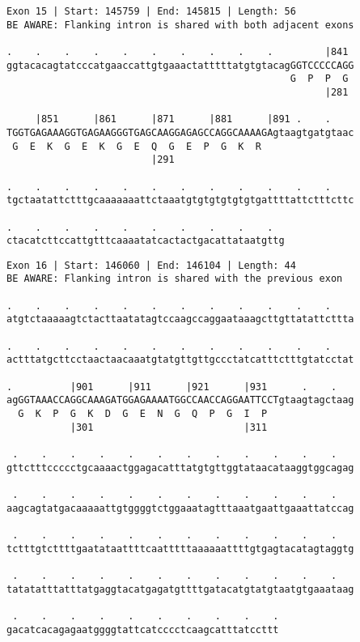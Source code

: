 \documentclass{article}
\begin{document}
\newpage
\begin{Verbatim}[fontfamily=courier]
Exon 15 | Start: 145759 | End: 145815 | Length: 56
BE AWARE: Flanking intron is shared with both adjacent exons

.    .    .    .    .    .    .    .    .    .         |841 
ggtacacagtatcccatgaaccattgtgaaactatttttatgtgtacagGGTCCCCCAGG
                                                 G  P  P  G 
                                                       |281 

     |851      |861      |871      |881      |891 .    .    
TGGTGAGAAAGGTGAGAAGGGTGAGCAAGGAGAGCCAGGCAAAAGAgtaagtgatgtaac
 G  E  K  G  E  K  G  E  Q  G  E  P  G  K  R                
                         |291                               

.    .    .    .    .    .    .    .    .    .    .    .    
tgctaatattctttgcaaaaaaattctaaatgtgtgtgtgtgtgattttattctttcttc

.    .    .    .    .    .    .    .    .    .  
ctacatcttccattgtttcaaaatatcactactgacattataatgttg
\end{Verbatim}
\newpage
\begin{Verbatim}[fontfamily=courier]
Exon 16 | Start: 146060 | End: 146104 | Length: 44
BE AWARE: Flanking intron is shared with the previous exon

.    .    .    .    .    .    .    .    .    .    .    .    
atgtctaaaaagtctacttaatatagtccaagccaggaataaagcttgttatattcttta

.    .    .    .    .    .    .    .    .    .    .    .    
actttatgcttcctaactaacaaatgtatgttgttgccctatcatttctttgtatcctat

.          |901      |911      |921      |931      .    .   
agGGTAAACCAGGCAAAGATGGAGAAAATGGCCAACCAGGAATTCCTgtaagtagctaag
  G  K  P  G  K  D  G  E  N  G  Q  P  G  I  P               
           |301                          |311               

 .    .    .    .    .    .    .    .    .    .    .    .   
gttctttccccctgcaaaactggagacatttatgtgttggtataacataaggtggcagag

 .    .    .    .    .    .    .    .    .    .    .    .   
aagcagtatgacaaaaattgtggggtctggaaatagtttaaatgaattgaaattatccag

 .    .    .    .    .    .    .    .    .    .    .    .   
tctttgtcttttgaatataattttcaatttttaaaaaattttgtgagtacatagtaggtg

 .    .    .    .    .    .    .    .    .    .    .    .   
tatatatttatttatgaggtacatgagatgttttgatacatgtatgtaatgtgaaataag

 .    .    .    .    .    .    .    .    .    .
gacatcacagagaatggggtattcatcccctcaagcatttatccttt
\end{Verbatim}
\end{document}
